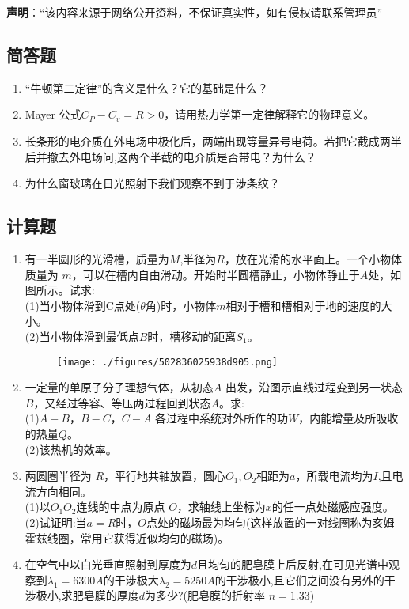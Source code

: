 

\textbf{声明}：“该内容来源于网络公开资料，不保证真实性，如有侵权请联系管理员”
\subsection{简答题}
\begin{enumerate}
\item “牛顿第二定律”的含义是什么？它的基础是什么？
\item  Mayer 公式$C_P-C_v=R>0$，请用热力学第一定律解释它的物理意义。
\item 长条形的电介质在外电场中极化后，两端出现等量异号电荷。若把它截成两半后并撤去外电场问,这两个半截的电介质是否带电？为什么？
\item 为什么窗玻璃在日光照射下我们观察不到于涉条纹？
\end{enumerate}
\subsection{计算题}
\begin{enumerate}
\item 有一半圆形的光滑槽，质量为$ M$,半径为$R$，放在光滑的水平面上。一个小物体质量为 $m$，可以在槽内自由滑动。开始时半圆槽静止，小物体静止于$A$处，如图所示。试求:\\
(1)当小物体滑到C点处($\theta$角)时，小物体$m$相对于槽和槽相对于地的速度的大小。\\
(2)当小物体滑到最低点$B$时，槽移动的距离$S_1$。
\begin{figure}[ht]
\centering
\texttt{[image: ./figures/502836025938d905.png]}
\caption{} \label{fig_SY19_1}
\end{figure}
\item 一定量的单原子分子理想气体，从初态$A$ 出发，沿图示直线过程变到另一状态$B$，又经过等容、等压两过程回到状态$ A$。求:\\
(1)$A-B$，$B-C$，$C-A$ 各过程中系统对外所作的功$W $，内能增量及所吸收的热量$Q$。\\
(2)该热机的效率。
\item 两圆圈半径为 $R$，平行地共轴放置，圆心$O_1,O_2$相距为$a$，所载电流均为$I$,且电流方向相同。\\
(1)以$O_1O_2$连线的中点为原点 $O$，求轴线上坐标为$x$的任一点处磁感应强度。\\(2)试证明:当$a=R$时，$O$点处的磁场最为均匀(这样放置的一对线圈称为亥姆霍兹线圈，常用它获得近似均匀的磁场)。
\item 在空气中以白光垂直照射到厚度为$d$且均匀的肥皂膜上后反射,在可见光谱中观察到$\lambda_1=6300A$的干涉极大$\lambda_2=5250A$的干涉极小,且它们之间没有另外的干涉极小,求肥皂膜的厚度$d$为多少?(肥皂膜的折射率 $n=1.33$)
\end{enumerate}
